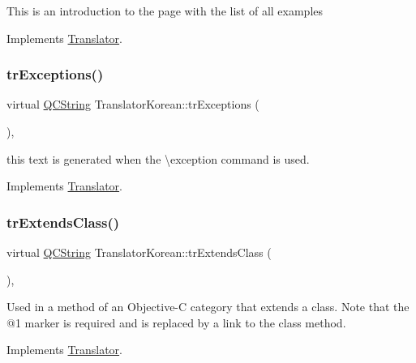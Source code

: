 This is an introduction to the page with the list of all examples 

Implements \mbox{\hyperlink{class_translator}{Translator}}.

\mbox{\label{class_translator_korean_a3a949bf771391965536d4d812938db2a}} 
\subsubsection{\texorpdfstring{trExceptions()}{trExceptions()}}
{\footnotesize\ttfamily virtual \mbox{\hyperlink{class_q_c_string}{Q\+C\+String}} Translator\+Korean\+::tr\+Exceptions (\begin{DoxyParamCaption}{ }\end{DoxyParamCaption})\hspace{0.3cm}{\ttfamily [inline]}, {\ttfamily [virtual]}}

this text is generated when the \textbackslash{}exception command is used. 

Implements \mbox{\hyperlink{class_translator}{Translator}}.

\mbox{\label{class_translator_korean_a75a4e4c569fcfd2d93760151477489f2}} 
\subsubsection{\texorpdfstring{trExtendsClass()}{trExtendsClass()}}
{\footnotesize\ttfamily virtual \mbox{\hyperlink{class_q_c_string}{Q\+C\+String}} Translator\+Korean\+::tr\+Extends\+Class (\begin{DoxyParamCaption}{ }\end{DoxyParamCaption})\hspace{0.3cm}{\ttfamily [inline]}, {\ttfamily [virtual]}}

Used in a method of an Objective-\/C category that extends a class. Note that the @1 marker is required and is replaced by a link to the class method. 

Implements \mbox{\hyperlink{class_translator}{Translator}}.

\mbox{\label{class_translator_korean_aa4c52e8d32d016b14a77cff015f9c9ee}} 
